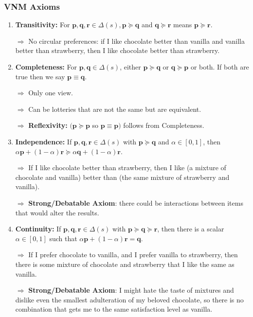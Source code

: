 \documentclass[13pt]{article}
\theoremstyle{definition}
\theoremstyle{remark}
\begin{document}
\subsubsection{VNM Axioms}

\begin{enumerate}[label=(\arabic*)]
  \item \textbf{Transitivity: } For $\mathbf{p}, \mathbf{q}, \mathbf{r} \in \Delta(s), \mathbf{p} \succeq \mathbf{q}$ and $\mathbf{q} \succeq \mathbf{r}$ means $\mathbf{p} \succeq \mathbf{r}$.

  $\Longrightarrow$ No circular preferences: if I like chocolate better than vanilla and vanilla better than strawberry, then I like chocolate better than strawberry.
  \item \textbf{Completeness: } For $\mathbf{p}, \mathbf{q} \in \Delta(s)$, either $\mathbf{p} \succeq \mathbf{q}$ or $\mathbf{q} \succeq \mathbf{p}$ or both. If both are true then we say $\mathbf{p} \equiv \mathbf{q}$.

  $\Longrightarrow$ Only one view.
  
  $\Longrightarrow$ Can be lotteries that are not the same but are equivalent.
  
  $\Longrightarrow$ \textbf{Reflexivity: } $(\mathbf{p} \succeq \mathbf{p}$ so $\mathbf{p} \equiv \mathbf{p})$ follows from Completeness.
  \item \textbf{Independence: } If $\mathbf{p}, \mathbf{q}, \mathbf{r} \in \Delta(s)$ with $\mathbf{p} \succeq \mathbf{q}$ and $\alpha \in[0,1]$, then $\alpha \mathbf{p}+(1-\alpha) \mathbf{r} \succeq \alpha \mathbf{q}+(1-\alpha) \mathbf{r}$.

  $\Longrightarrow$ If I like chocolate better than strawberry, then I like (a mixture of chocolate and vanilla) better than (the same mixture of strawberry and vanilla).

  $\Longrightarrow$ \textbf{Strong/Debatable Axiom}: there could be interactions between items that would alter the results.
  \item \textbf{Continuity: } If $\mathbf{p}, \mathbf{q}, \mathbf{r} \in \Delta(s)$ with $\mathbf{p} \succeq \mathbf{q} \succeq \mathbf{r}$, then there is a scalar $\alpha \in[0,1]$ such that $\alpha \mathbf{p}+(1-\alpha) \mathbf{r}=\mathbf{q}$.

  $\Longrightarrow$ If I prefer chocolate to vanilla, and I prefer vanilla to strawberry, then there is some mixture of chocolate and strawberry that I like the same as vanilla.

  $\Longrightarrow$ \textbf{Strong/Debatable Axiom}: I might hate the taste of mixtures and dislike even the smallest adulteration of my beloved chocolate, so there is no combination that gets me to the same satisfaction level as vanilla.
\end{enumerate}
\end{document}
